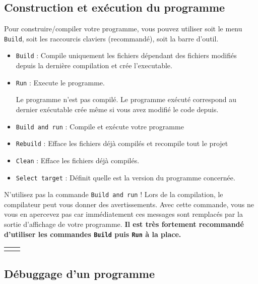\subsection{Construction et exécution du programme}
    
Pour construire/compiler votre programme, vous pouvez utiliser soit le menu \verb-Build-, soit les raccourcis claviers (recommandé), soit la barre d'outil.    
\begin{itemize}
  \item \verb-Build- : Compile uniquement les fichiers dépendant des fichiers modifiés depuis la dernière compilation et crée l'executable.
  \item \verb-Run- : Execute le programme.
  \begin{warning}
  Le programme n'est pas compilé. Le programme exécuté correspond au dernier exécutable crée même si vous avez modifié le code depuis. 
  \end{warning}
  \item \verb-Build and run- : Compile et exécute votre programme
  \item \verb-Rebuild- : Efface les fichiers déjà compilés et recompile tout le projet
  \item \verb-Clean- : Efface les fichiers déjà compilés.
  \item \verb-Select target- : Définit quelle est la version du programme concernée.  
\end{itemize}
 
\begin{commonerrors}
N'utilisez pas la commande \verb-Build and run- ! Lors de la compilation, le compilateur peut vous donner des avertissements. Avec cette commande, vous ne vous en apercevez pas car immédiatement ces messages sont remplacés par la sortie d'affichage de votre programme. {\bf\color{red}Il est très fortement recommandé d'utiliser les commandes \verb-Build- puis \verb'Run' à la place.} 
\end{commonerrors}

\begin{center} 
\begin{tabu}{X[c,m]X[c,m]}
&
\end{tabu}
\end{center}
    
\subsection{Débuggage d'un programme}

